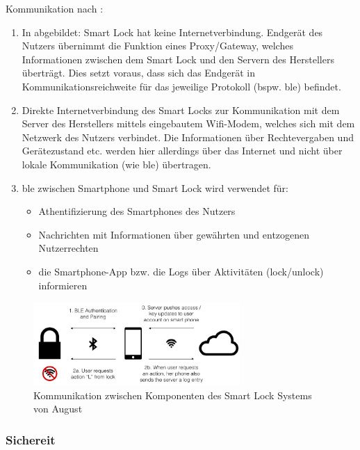         Kommunikation nach \citeauthor{Ho2016}:
        \begin{enumerate}
            \item In  abgebildet: Smart Lock hat keine Internetverbindung.
                Endgerät des Nutzers übernimmt die Funktion eines Proxy/Gateway, welches Informationen zwischen dem Smart Lock und den Servern des Herstellers überträgt.
                Dies setzt voraus, dass sich das Endgerät in Kommunikationsreichweite für das jeweilige Protokoll (bspw. \gls{ble}) befindet.
            \item Direkte Internetverbindung des Smart Locks zur Kommunikation mit dem Server des Herstellers mittels eingebautem Wifi-Modem, welches sich mit dem Netzwerk des Nutzers verbindet.
                Die Informationen über Rechtevergaben und Gerätezustand etc. werden hier allerdings über das Internet und nicht über lokale Kommunikation (wie \gls{ble}) übertragen.
            \item \gls{ble} zwischen Smartphone und Smart Lock wird verwendet für:
                \begin{itemize}
                    \item Athentifizierung des Smartphones des Nutzers 
                    \item Nachrichten mit Informationen über gewährten und entzogenen Nutzerrechten
                    \item die Smartphone-App bzw. die Logs über Aktivitäten (lock/unlock) informieren
                \end{itemize}
        \end{enumerate}
        
		\begin{figure}[H]
			\centering
			\includegraphics[width=0.7\textwidth]{paperNotes/ho2016_components}
			\caption{Kommunikation zwischen Komponenten des Smart Lock Systems von August}
			\label{fig:gateway}
		\end{figure}

    \subsubsection{Sichereit}

